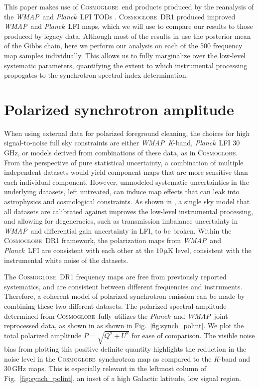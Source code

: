 \documentclass[twocolumn]{../../common/aa}
\def\WMAP{\emph{WMAP}}
\def\Planck{\emph{Planck}}
\newcommand{\cosmoglobe}{\textsc{Cosmoglobe}}
\newcommand{\K}[0]{\textit K}
\begin{document}
This paper makes use of \cosmoglobe\ end products produced by the reanalysis of the \WMAP\ and \Planck\ LFI TODs \citep{watts2023_dr1}. \cosmoglobe\ DR1 produced  improved \WMAP\ and \Planck\ LFI maps, which we will use to compare our results to those produced by legacy data. 
Although most of the results in \citet{watts2023_dr1} use the posterior mean of the Gibbs chain, here we perform our analysis on each of the  500 frequency map samples individually. This allows us to fully marginalize over the low-level systematic parameters, quantifying the extent to which instrumental processing propogates to the synchrotron spectral index determination.


\section{Polarized synchrotron amplitude}
\label{sec:pol_amp}




When using external data for polarized foreground cleaning, the choices for high signal-to-noise full sky constraints are either \WMAP\ \K-band, \Planck\ LFI 30\,GHz, or models derived from combinations of these data, as in \cosmoglobe. From the perspective of pure statistical uncertainty, a combination of multiple independent datasets would yield component maps that are more sensitive than each individual component. However, unmodeled systematic uncertainties in the underlying datasets, left untreated, can induce map effects that can leak into astrophysics and cosmological constraints.
As shown in \citet{watts2023_dr1}, a single sky model that all datasets are calibrated against improves the low-level instrumental processing, and allowing for degeneracies, such as transmission imbalance uncertainty in \WMAP\ and differential gain uncertainty in LFI, to be broken. Within the \cosmoglobe\ DR1 framework, the polarization maps from \WMAP\ and \Planck\ LFI are consistent with each other at the $10\,\mathrm{\mu K}$ level, consistent with the instrumental white noise of the datasets.

The \cosmoglobe\ DR1 frequency maps are free from previously reported systematics, and are consistent between different frequencies and instruments. Therefore, a coherent model of polarized synchrotron emission can be made by combining these two different datasets.
The polarized spectral amplitude determined from \cosmoglobe\ fully utilizes the \Planck\ and \WMAP\ joint reprocessed data, as shown in as shown in Fig.~\ref{fig:synch_polint}. 
We plot the total polarized amplitude $P=\sqrt{Q^2+U^2}$ for ease of comparison. The visible noise bias from plotting this positive definite quantity highlights the reduction in the noise level in the \cosmoglobe\ synchrotron map as compared to the \K-band and 30\,GHz maps. This is especially relevant in the leftmost column of Fig.~\ref{fig:synch_polint}, an inset of a high Galactic latitude, low signal region.
\end{document}
